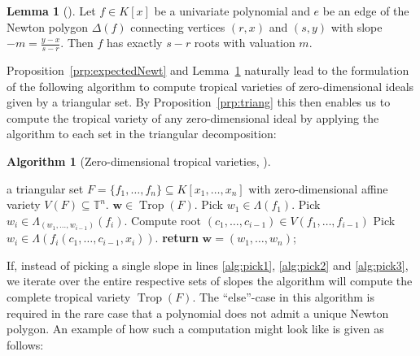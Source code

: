 \documentclass[
  paper=a4,
  titlepage,
  bibliography=totoc,
  pagesize=pdftex
]{scrartcl}
\numberwithin{figure}{section}
\numberwithin{equation}{section}
\numberwithin{table}{section}
\newcommand*\setT{\mathds{T}}
\let\vec\mathbf
\DeclareMathOperator{\Trop}{Trop}
\theoremstyle{definition}
\newtheorem{lemma}[definition]{Lemma}
\newtheorem{algo}[definition]{Algorithm}
\numberwithin{definition}{section}
\begin{document}
\begin{lemma}[{\cite[Proposition~II.6.3]{neuAlg}}]
  Let $f \in K[x]$ be a univariate polynomial and $e$ be an edge of the Newton polygon
  $\Delta(f)$ connecting vertices $(r,x)$ and $(s, y)$ with slope $-m = \frac{y-x}{s-r}$.
  Then $f$ has exactly $s-r$ roots with valuation $m$.
  \label{lem:newtPolyRoots}
\end{lemma}

Proposition~\ref{prp:expectedNewt} and Lemma~\ref{lem:newtPolyRoots} naturally lead to the
formulation of the following algorithm to compute tropical varieties of zero-dimensional
ideals given by a triangular set. By Proposition~\ref{prp:triang} this then enables us to
compute the tropical variety of any zero-dimensional ideal by applying the algorithm to
each set in the triangular decomposition:

\begin{algo}[Zero-dimensional tropical varieties,
  {\cite[Algorithm~2.10]{tropPointsLinks}}] $ $
  \begin{algorithmic}[1]
    \Require a triangular set $F = \{f_1, \dots, f_n\} \subseteq K[x_1, \dots, x_n]$ with
    zero-dimensional affine variety $V(F) \subseteq \setT^n$.
    \Ensure $\vec w \in \Trop(F)$.
    \State Pick $w_1 \in \Lambda(f_1)$.
    \label{alg:pick1}
        \State Pick $w_i \in \Lambda_{(w_1, \dots, w_{i-1})}(f_i)$.
        \label{alg:pick2}
      \Else
        \State Compute root $(c_1, \dots, c_{i-1}) \in V(f_1, \dots, f_{i-1})$
        \State Pick $w_i \in \Lambda(f_i(c_1, \dots, c_{i-1}, x_i))$.
        \label{alg:pick3}
      \EndIf
    \EndFor
    \State \textbf{return} $\vec w = (w_1, \dots, w_n)$;
  \end{algorithmic}
  \label{alg:zeroDimTrop}
\end{algo}

If, instead of picking a single slope in lines \ref{alg:pick1}, \ref{alg:pick2} and
\ref{alg:pick3}, we iterate over the entire respective sets of slopes the algorithm will
compute the complete tropical variety $\Trop(F)$. The \enquote{else}-case in this
algorithm is required in the rare case that a polynomial does not admit a unique Newton
polygon. An example of how such a computation might look like is given as follows:
\end{document}
